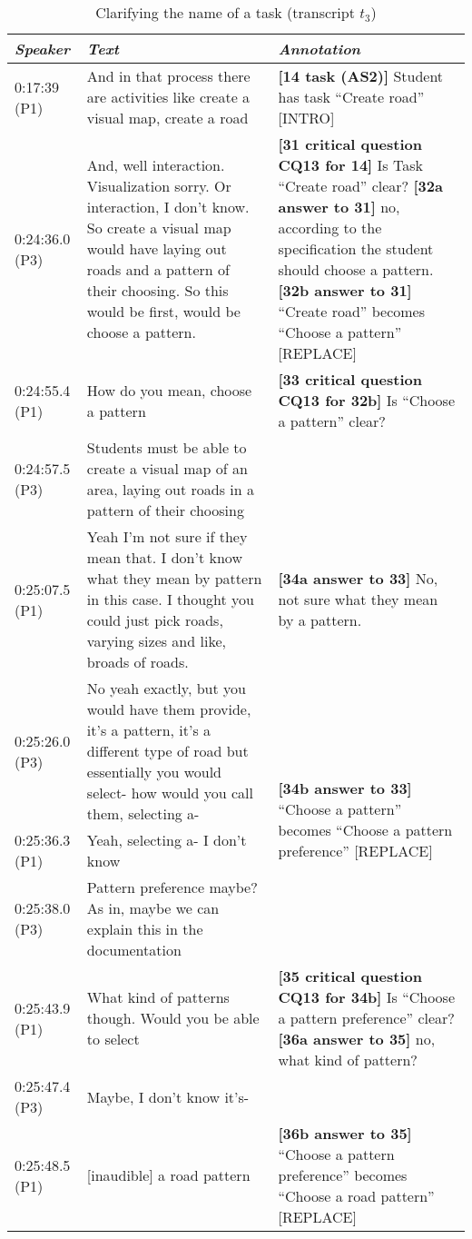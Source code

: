 \begin{table}[!htbp]
\begin{tabular}{|p{17mm}|p{63mm}|p{70mm}|}
\hline
\textit{Speaker} & \textit{Text} & \textit{Annotation}\\
\hline
0:17:39 (P1) & And in that process there are activities like create a visual map, create a road& \textbf{[14 task (AS2)]} Student has task ``Create road'' \textsf{[INTRO]}\\
\hline
0:24:36.0 (P3)	& And, well interaction. Visualization sorry. Or interaction, I don't know. So create a visual map would have laying out roads and a pattern of their choosing. So this would be first, would be choose a pattern. & \textbf{[31 critical question CQ13 for 14]} Is Task ``Create road'' clear?\newline
\textbf{[32a answer to 31]} no, according to the specification the student should choose a pattern. \newline
\textbf{[32b answer to 31]} ``Create road'' becomes ``Choose a pattern'' \textsf{[REPLACE]}\\
\hline
0:24:55.4 (P1) &	How do you mean, choose a pattern	& \textbf{[33 critical question CQ13 for 32b]} Is ``Choose a pattern'' clear? \\
\cline{1-2}
0:24:57.5 (P3)	& Students must be able to create a visual map of an area, laying out roads in a pattern of their choosing	&\\
\cline{1-2}
0:25:07.5 (P1)	& Yeah I'm not sure if they mean that. I don't know what they mean by pattern in this case. I thought you could just pick roads, varying sizes and like, broads of roads. & 
\textbf{[34a answer to 33]} No, not sure what they mean by a pattern.\\
\cline{1-2}
0:25:26.0 (P3) & No yeah exactly, but you would have them provide, it's a pattern, it's a different type of road but essentially you would select- how would you call them, selecting a- & \multirow{3}{70mm}{\textbf{[34b answer to 33]} ``Choose a pattern'' becomes ``Choose a pattern preference'' \textsf{[REPLACE]}}\\
\cline{1-2}
0:25:36.3 (P1) & Yeah, selecting a- I don't know &\\
\cline{1-2}
0:25:38.0 (P3)	& Pattern preference maybe? As in, maybe we can explain this in the documentation &\\
\hline
0:25:43.9 (P1) & What kind of patterns though. Would you be able to select & \textbf{[35 critical question CQ13 for 34b]} Is ``Choose a pattern preference'' clear?\newline
\textbf{[36a answer to 35]} no, what kind of pattern?\\
\cline{1-2}
0:25:47.4 (P3) & Maybe, I don't know it's- & \\
\cline{1-2}
0:25:48.5 (P1)	& [inaudible] a road pattern& \multirow{2}{70mm}{\textbf{[36b answer to 35]} ``Choose a pattern preference'' becomes ``Choose a road pattern'' \textsf{[REPLACE]}}\\
\hline
\end{tabular}
\caption{Clarifying the name of a task (transcript $t_3$)}
\label{table:transcript:task-clarification}


\end{table}
